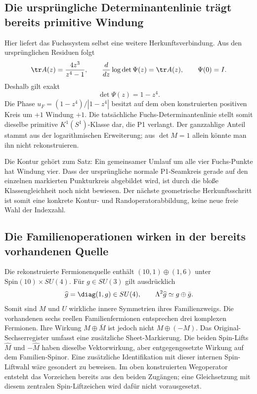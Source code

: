 \subsection{Die ursprüngliche Determinantenlinie trägt bereits primitive Windung}\label{sec:fuchswinding}
Hier liefert das Fuchssystem selbst eine weitere Herkunftsverbindung. Aus den ursprünglichen Residuen folgt
\begin{equation}
\tr A(z)=\frac{4z^3}{z^4-1},\qquad
\frac{d}{dz}\log\det\Psi(z)=\tr A(z),\qquad \Psi(0)=I.
\end{equation}
Deshalb gilt exakt
\begin{equation}
\boxed{\det\Psi(z)=1-z^4.}
\end{equation}
Die Phase $u_F=(1-z^4)/|1-z^4|$ besitzt auf dem oben konstruierten positiven Kreis um $+1$ Windung $+1$. Die tatsächliche Fuchs-Determinantenlinie stellt somit dieselbe primitive $K^1(S^1)$-Klasse dar, die P1 verlangt. Der ganzzahlige Anteil stammt aus der logarithmischen Erweiterung; aus $\det M=1$ allein könnte man ihn nicht rekonstruieren.

Die Kontur gehört zum Satz: Ein gemeinsamer Umlauf um alle vier Fuchs-Punkte hat Windung vier. Dass der ursprüngliche normale P1-Seamkreis gerade auf den einzelnen markierten Punkturkreis abgebildet wird, ist durch die bloße Klassengleichheit noch nicht bewiesen. Der nächste geometrische Herkunftsschritt ist somit eine konkrete Kontur- und Randoperatorabbildung, keine neue freie Wahl der Indexzahl.

\subsection{Die Familienoperationen wirken in der bereits vorhandenen Quelle}
Die rekonstruierte Fermionenquelle enthält $(10,1)\oplus(1,6)$ unter $\mathrm{Spin}(10)\times SU(4)$. Für $g\in SU(3)$ gilt ausdrücklich
\begin{equation}
\widehat g=\diag(1,g)\in SU(4),\qquad
\Lambda^2\widehat g\simeq g\oplus\bar g.
\end{equation}
Somit sind $M$ und $U$ wirkliche innere Symmetrien ihres Familienzweigs. Die vorhandenen sechs reellen Familienfermionen entsprechen drei komplexen Fermionen. Ihre Wirkung $M\oplus\bar M$ ist jedoch nicht $M\oplus(-M)$. Das Original-Sechserregister umfasst eine zusätzliche Sheet-Markierung. Die beiden Spin-Lifts $\widehat M$ und $-\widehat M$ haben dieselbe Vektorwirkung, aber entgegengesetzte Wirkung auf dem Familien-Spinor. Eine zusätzliche Identifikation mit dieser internen Spin-Liftwahl wäre gesondert zu beweisen. Im oben konstruierten Wegoperator entsteht das Vorzeichen bereits aus den beiden Zugängen; eine Gleichsetzung mit diesem zentralen Spin-Liftzeichen wird dafür nicht vorausgesetzt.

